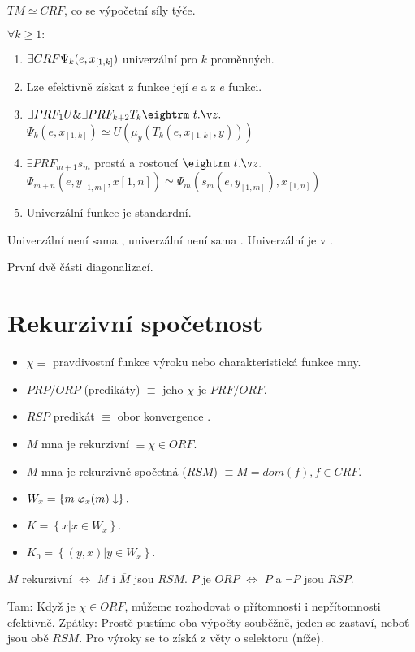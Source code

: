 \begin{multicols}{3}
\thm{} $TM \simeq CRF$, co se výpočetní síly týče.

\prf{} 

 $\forall k \ge 1:$

\begin{enumerate}
\item $\exists CRF \Psi_k(e, x_{[1,k]})$ univerzální pro $k$ proměnných.
\item Lze efektivně získat z funkce její $e$ a z $e$ funkci.
\item $\exists PRF_1 U \& \exists PRF_{k+2} T_k \st$ \hfil\break
$\Psi_k(e, x_{[1,k]}) \simeq U(\mu_y(T_k(e, x_{[1,k]},y)))$
\item $\exists PRF_{m+1} s_m$ prostá a rostoucí $\st$ \hfil\break
$\Psi_{m+n}(e,y_{[1,m]},x{[1,n]}) \simeq \Psi_m\left(s_m(e,y_{[1,m]}), x_{[1,n]}\right)$
\item Univerzální funkce je standardní.
\end{enumerate}

\thm{} Univerzální \PRF není sama \PRF, univerzální \ORF není sama \ORF. Univerzální \PRF je v \ORF.

\prf{} První dvě části diagonalizací.

\section{Rekurzivní spočetnost}
\begin{itemize}
\item $\chi \equiv$ pravdivostní funkce výroku nebo charakteristická funkce mny.
\item $PRP/ORP$ (predikáty) $\equiv$ jeho $\chi$ je $PRF/ORF$.
\item $RSP$ predikát $\equiv$ obor konvergence \CRF.
\item $M$ mna je rekurzivní $\equiv \chi \in ORF$.
\item $M$ mna je rekurzivně spočetná ($RSM$) $\equiv M = dom(f), f \in CRF$.
\item $W_x = \left\{ m | \varphi_x(m) \downarrow \right\}.$
\item $K = \left\{x | x \in W_x \right\}.$
\item $K_0 = \left\{ (y,x) | y \in W_x \right\}.$
\end{itemize}

 $M$ rekurzivní $\iff$ $M$ i $\overline{M}$ jsou $RSM$. $P$ je $ORP$ $\iff$ $P$ a $\neg P$ jsou $RSP$.

\prf{} Tam: Když je $\chi \in ORF$, můžeme rozhodovat o přítomnosti i nepřítomnosti
efektivně. Zpátky: Prostě pustíme oba výpočty souběžně, jeden se zastaví, neboť jsou
obě $RSM$. Pro výroky se to získá z věty o selektoru (níže).


\end{multicols}

